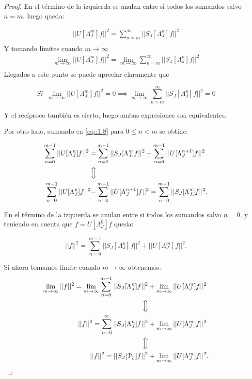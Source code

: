 \begin{proof}
  \noindent En el término de la izquierda se anulan entre si todos los sumandos salvo $n=m$, luego queda: 

  \begin{align*}
    ||U[\Lambda_J^m]f||^2 =\sum_{n=m}^\infty ||S_J[\Lambda_J^n]f||^2  \\
  \end{align*}
  \noindent Y tomando límites cuando $m\rightarrow \infty$
  \begin{align*}
    \lim_{m\rightarrow \infty}||U[\Lambda_J^m]f||^2 =\lim_{m\rightarrow \infty}\sum_{n=m}^\infty ||S_J[\Lambda_J^n]f||^2  \\
  \end{align*}
  \noindent Llegados a este punto se puede apreciar claramente que
  
  $$Si \; \; \lim_{m\rightarrow \infty} ||U[\Lambda_J^m]f||^2=0 \implies \lim_{m\rightarrow\infty} \sum_{n=m}^{\infty} ||S_J[\Lambda_J^n]f||^2=0$$

  \noindent Y el recíproco también es cierto, luego ambas expresiones son equivalentes.

  \medskip

  \noindent Por otro lado, sumando en \eqref{eq::1.8} para $0\leq n < m$ se obtine:

  \begin{align*}
    \sum_{n=0}^{m-1} ||U[\Lambda_J^n]f||^2=&\sum_{n=0}^{m-1} ||S_J[\Lambda_J^n]f||^2 +\sum_{n=0}^{m-1}||U[\Lambda_J^{n+1}]f||^2 \\
    \Big\Updownarrow \\
    \sum_{n=0}^{m-1} ||U[\Lambda_J^n]f||^2 -& \sum_{n=0}^{m-1}||U[\Lambda_J^{n+1}]f||^2 = \sum_{n=0}^{m-1} ||S_J[\Lambda_J^n]f||^2.  \\
  \end{align*}
  
  \noindent En el término de la izquierda se anulan entre si todos los sumandos salvo $n=0$, y teniendo en cuenta que $f=U[\Lambda_J^0]f$ queda:
  
  \begin{equation}
    ||f||^2=\sum_{n=0}^{m-1} ||S_J[\Lambda_J^n]f||^2 + ||U[\Lambda_J^m]f||^2.
  \end{equation}

  \noindent Si ahora tomamos límite cuando $m\rightarrow \infty$ obtenemos: 
  \begin{align*}
    \lim_{m\rightarrow \infty}||f||^2 =\lim_{m\rightarrow \infty}\sum_{n=0}^{m-1} ||S_J[\Lambda_J^n]f||^2 &+ \lim_{m\rightarrow \infty} ||U[\Lambda_J^m]f||^2  \\
    \Big\Updownarrow \\
    ||f||^2 =\sum_{n=0}^{\infty} ||S_J[\Lambda_J^n]f||^2 &+ \lim_{m\rightarrow \infty} ||U[\Lambda_J^m]f||^2  \\
    \Big\Updownarrow \\
    ||f||^2 =||S_J[\mathcal{P_J}]f||^2 &+ \lim_{m\rightarrow \infty} ||U[\Lambda_J^m]f||^2.  \\
  \end{align*}


\end{proof}
